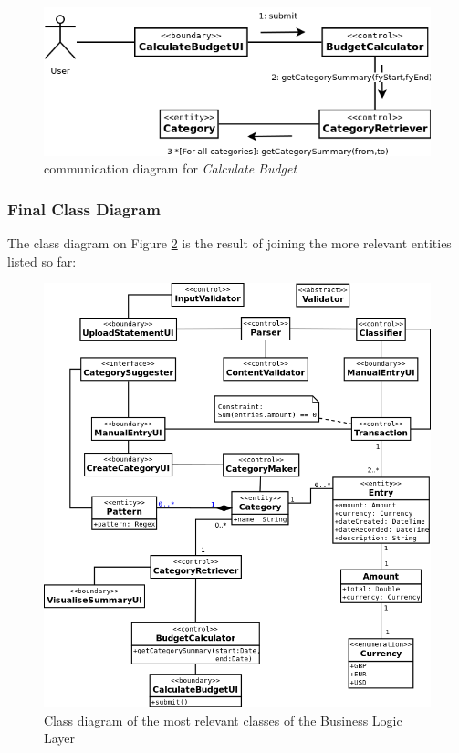 \begin{figure}[ht!]
  \begin{center}
    \includegraphics[width=14cm]{./contents/img/Comm_Diagram_-_Calculate_Budget.png}
  \end{center}
  \caption{communication diagram for \emph{Calculate Budget}}
  \label{fig:CommDiagram.CalculateBudget}
\end{figure}
\FloatBarrier


\subsubsection{Final Class Diagram}
The class diagram on Figure \ref{fig:ClassDiagram.AllClasses} is the result of
joining the more relevant entities listed so far:
\begin{figure}[ht!]
  \begin{center}
    \includegraphics[width=15cm]{./contents/img/Class_Diagram_-_All_Classes.png}
  \end{center}
  \caption{Class diagram of the most relevant classes of the Business Logic Layer}
  \label{fig:ClassDiagram.AllClasses}
\end{figure}
\FloatBarrier

